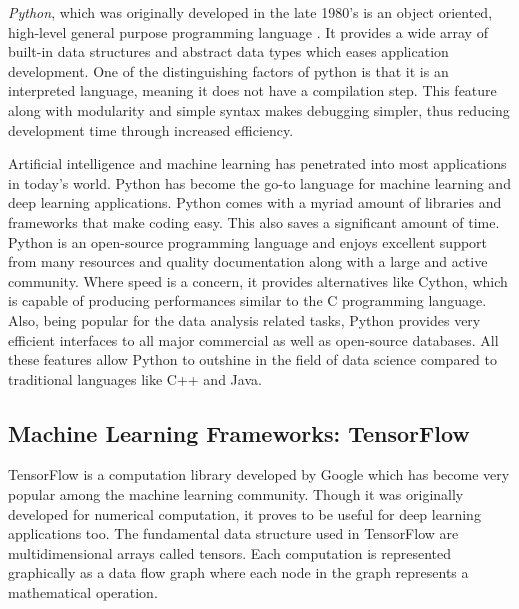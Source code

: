 \textit{Python}, which was originally developed in the late 1980's is an object oriented, high-level general purpose programming language \cite{van2007python}. It provides a wide array of built-in data structures and abstract data types which eases application development. One of the distinguishing factors of python is that it is an interpreted language, meaning it does not have a compilation step. This feature along with modularity and simple syntax makes debugging simpler, thus reducing development time through increased efficiency.

Artificial intelligence and machine learning has penetrated into most applications in today's world. Python has become the go-to language for machine learning and deep learning applications. Python comes with a myriad amount of libraries and frameworks that make coding easy. This also saves a significant amount of time. Python is an open-source programming language and enjoys excellent support from many resources and quality documentation along with a large and active community. Where speed is a concern, it provides alternatives like Cython, which is capable of producing performances similar to the C programming language. Also, being popular for the data analysis related tasks, Python provides very efficient interfaces to all major commercial as well as open-source databases. All these features allow Python to outshine in the field of data science compared to traditional languages like C++ and Java.


\subsection{Machine Learning Frameworks: TensorFlow}
TensorFlow \cite{abadi2016tensorflow} is a computation library developed by Google which has become very popular among the machine learning community. Though it was originally developed for numerical computation, it proves to be useful for deep learning applications too.
The fundamental data structure used in TensorFlow are multidimensional arrays called tensors. Each computation is represented graphically as a data flow graph \cite{tensorflow_2019} where each node in the graph represents a mathematical operation. 

